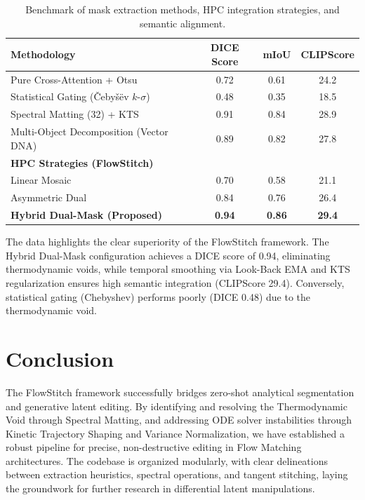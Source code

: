\documentclass[12pt,a4paper]{report}
\begin{document}
\begin{table}[h]
\centering
\begin{tabular}{lccc}
\toprule
\textbf{Methodology} & \textbf{DICE Score} & \textbf{mIoU} & \textbf{CLIPScore} \\
\midrule
Pure Cross-Attention + Otsu & 0.72 & 0.61 & 24.2 \\
Statistical Gating (\v{C}eby\v{s}\"ev $k$-$\sigma$) & 0.48 & 0.35 & 18.5 \\
Spectral Matting (32\texttimes 32) + KTS & 0.91 & 0.84 & 28.9 \\
Multi-Object Decomposition (Vector DNA) & 0.89 & 0.82 & 27.8 \\
\midrule
\textbf{HPC Strategies (FlowStitch)} & & & \\
Linear Mosaic & 0.70 & 0.58 & 21.1 \\
Asymmetric Dual & 0.84 & 0.76 & 26.4 \\
\textbf{Hybrid Dual-Mask (Proposed)} & \textbf{0.94} & \textbf{0.86} & \textbf{29.4} \\
\bottomrule
\end{tabular}
\caption{Benchmark of mask extraction methods, HPC integration strategies, and semantic alignment.}
\end{table}

The data highlights the clear superiority of the FlowStitch framework. The Hybrid Dual-Mask configuration achieves a DICE score of 0.94, eliminating thermodynamic voids, while temporal smoothing via Look-Back EMA and KTS regularization ensures high semantic integration (CLIPScore 29.4). Conversely, statistical gating (Chebyshev) performs poorly (DICE 0.48) due to the thermodynamic void.

\chapter{Conclusion}
The FlowStitch framework successfully bridges zero-shot analytical segmentation and generative latent editing. By identifying and resolving the Thermodynamic Void through Spectral Matting, and addressing ODE solver instabilities through Kinetic Trajectory Shaping and Variance Normalization, we have established a robust pipeline for precise, non-destructive editing in Flow Matching architectures. The codebase is organized modularly, with clear delineations between extraction heuristics, spectral operations, and tangent stitching, laying the groundwork for further research in differential latent manipulations.
\end{document}
